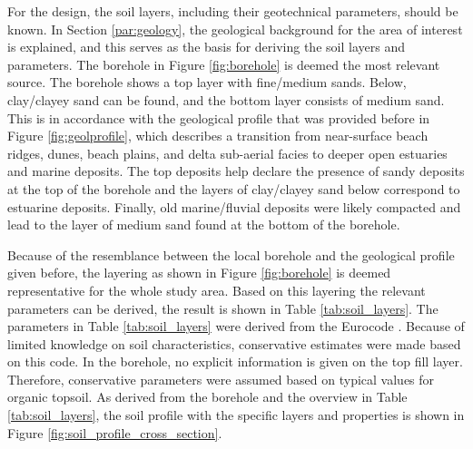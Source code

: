 For the design, the soil layers, including their geotechnical parameters, should be known. In Section \ref{par:geology}, the geological background for the area of interest is explained, and this serves as the basis for deriving the soil layers and parameters. The borehole in Figure \ref{fig:borehole} is deemed the most relevant source. The borehole shows a top layer with fine/medium sands. Below, clay/clayey sand can be found, and the bottom layer consists of medium sand. This is in accordance with the geological profile that was provided before in Figure \ref{fig:geolprofile}, which describes a transition from near-surface beach ridges, dunes, beach plains, and delta sub-aerial facies to deeper open estuaries and marine deposits. The top deposits help declare the presence of sandy deposits at the top of the borehole and the layers of clay/clayey sand below correspond to estuarine deposits. Finally, old marine/fluvial deposits were likely compacted and lead to the layer of medium sand found at the bottom of the borehole.

Because of the resemblance between the local borehole and the geological profile given before, the layering as shown in Figure \ref{fig:borehole} is deemed representative for the whole study area. Based on this layering the relevant parameters can be derived, the result is shown in Table \ref{tab:soil_layers}. The parameters in Table \ref{tab:soil_layers} were derived from the Eurocode \autocite{stichtingkoninklijknederlandsnormalisatieinstituutNederlandseNormNEN2025}. Because of limited knowledge on soil characteristics, conservative estimates were made based on this code. In the borehole, no explicit information is given on the top fill layer. Therefore, conservative parameters were assumed based on typical values for organic topsoil. As derived from the borehole and the overview in Table \ref{tab:soil_layers}, the soil profile with the specific layers and properties is shown in Figure \ref{fig:soil_profile_cross_section}. 

